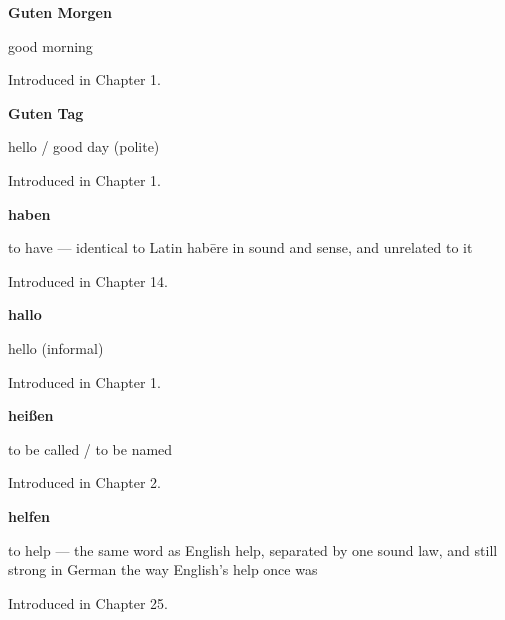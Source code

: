 \noindent\begin{minipage}[t]{\linewidth}
\raggedright
\textbf{Guten Morgen}\par
\small good morning\par
\footnotesize Introduced in Chapter 1.
\end{minipage}\par\medskip

\noindent\begin{minipage}[t]{\linewidth}
\raggedright
\textbf{Guten Tag}\par
\small hello / good day (polite)\par
\footnotesize Introduced in Chapter 1.
\end{minipage}\par\medskip

\noindent\begin{minipage}[t]{\linewidth}
\raggedright
\textbf{haben}\par
\small to have — identical to Latin habēre in sound and sense, and unrelated to it\par
\footnotesize Introduced in Chapter 14.
\end{minipage}\par\medskip

\noindent\begin{minipage}[t]{\linewidth}
\raggedright
\textbf{hallo}\par
\small hello (informal)\par
\footnotesize Introduced in Chapter 1.
\end{minipage}\par\medskip

\noindent\begin{minipage}[t]{\linewidth}
\raggedright
\textbf{heißen}\par
\small to be called / to be named\par
\footnotesize Introduced in Chapter 2.
\end{minipage}\par\medskip

\noindent\begin{minipage}[t]{\linewidth}
\raggedright
\textbf{helfen}\par
\small to help — the same word as English help, separated by one sound law, and still strong in German the way English's help once was\par
\footnotesize Introduced in Chapter 25.
\end{minipage}\par\medskip


